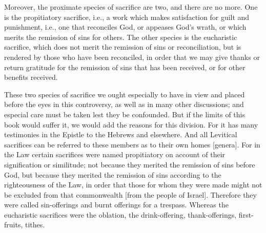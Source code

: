 Moreover, the proximate species of sacrifice are two, and there are
no more.  One is the propitiatory sacrifice, i.e., a work which makes
satisfaction for guilt and punishment, i.e., one that reconciles God,
or appeases God's wrath, or which merits the remission of sins for
others.  The other species is the eucharistic sacrifice, which does
not merit the remission of sins or reconciliation, but is rendered by
those who have been reconciled, in order that we may give thanks or
return gratitude for the remission of sins that has been received, or
for other benefits received.

These two species of sacrifice we ought especially to have in view
and placed before the eyes in this controversy, as well as in many
other discussions; and especial care must be taken lest they be
confounded.  But if the limits of this book would suffer it, we would
add the reasons for this division.  For it has many testimonies in
the Epistle to the Hebrews and elsewhere.  And all Levitical
sacrifices can be referred to these members as to their own homes
[genera].  For in the Law certain sacrifices were named propitiatory
on account of their signification or similitude; not because they
merited the remission of sins before God, but because they merited
the remission of sins according to the righteousness of the Law, in
order that those for whom they were made might not be excluded from
that commonwealth [from the people of Israel].  Therefore they were
called sin-offerings and burnt offerings for a trespass.  Whereas the
eucharistic sacrifices were the oblation, the drink-offering,
thank-offerings, first-fruits, tithes.

